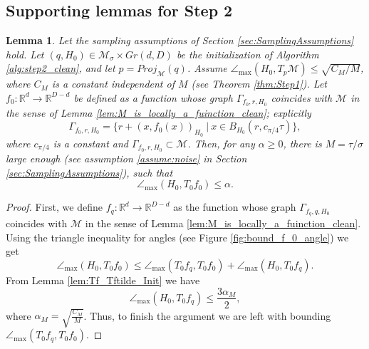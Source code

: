 \documentclass[12pt]{article}
\newtheorem{Lemma}[Theorem]{Lemma}
\theoremstyle{remark}
\newcommand{\RR}{\mathbb{R}}
\newcommand{\MM}{\mathcal{M}}
\newcommand{\maxangle}{\angle_{\max}}
\newcommand{\sM}{{M}}
\begin{document}
\begin{appendices}
\section{Supporting lemmas for Step 2}
\begin{Lemma}\label{lem:H0_Tf_Init}
    Let the sampling assumptions of Section \ref{sec:SamplingAssumptions} hold. Let $(q, H_0)\in \MM_\sigma\times Gr(d,D)$ be the initialization of Algorithm \ref{alg:step2_clean}, and let $p = Proj_\MM(q)$. 
    Assume $\maxangle (H_0, T_p\MM) \leq \sqrt{C_\sM/M}$, where $C_\sM$ is a constant independent of $M$ \emph{(}see Theorem \ref{thm:Step1}\emph{)}. %
    Let $ f_{0}:\RR^d\to\RR^{D-d} $ be defined %
    as a function whose graph $ \Gamma_{f_{0}, r, H_0} $ coincides with $ \MM $ in the sense of Lemma \ref{lem:M_is_locally_a_fuinction_clean}; explicitly 
	\[
	\Gamma_{f_{0},r, H_0} = \{r + (x, f_{0}(x))_{H_0} ~|~ x\in B_{H_0}(r, c_{\pi/4}\tau)\}
	,\]
	where $c_{\pi/4}$ is a constant and $\Gamma_{f_0, r, H_0} \subset \MM$.
    Then, for any $\alpha  \geq 0$, there is  $M=\tau/\sigma $ large enough \emph{(}see assumption \ref{assume:noise} in Section \ref{sec:SamplingAssumptions}\emph{)}, such that  
	\[
	\maxangle(H_0, T_0 f_{0}) 
	\leq  \alpha
	.\]
\end{Lemma}
\begin{proof}
First, we define $f_{q}:\RR^d\to\RR^{D-d}$ as the function whose graph $\Gamma_{f_{q}, q, H_0}$ coincides with $\MM$ in the sense of Lemma \ref{lem:M_is_locally_a_fuinction_clean}.
Using the triangle inequality for angles (see Figure \ref{fig:bound_f_0_angle}) we get
    \begin{equation}\label{eq:Tri-angle}
    \maxangle(H_0, T_0 f_{0}) \leq 
    \maxangle(T_0 f_{q}, T_0 f_{0}) +
    \maxangle(H_0, T_0 f_{q}) 
    .\end{equation}
    From Lemma \ref{lem:Tf_Tftilde_Init} we have
    \begin{equation}\label{eq:Tri-angle_part1}
    \maxangle(H_0, T_0 f_{q})  \leq \frac{3\alpha_M}{2}
    ,\end{equation}
    where $\alpha_M = \sqrt{\frac{C_\sM}{M}}$.
    Thus, to finish the argument we are left with bounding $\maxangle(T_0 f_{q}, T_0 f_{0}) $.
    

\end{proof}
\end{appendices}
\end{document}
